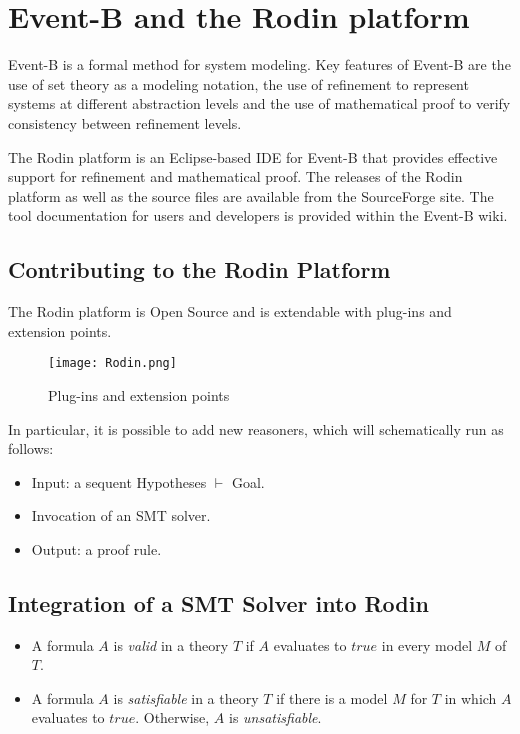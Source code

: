 \section{Event-B and the Rodin platform}
Event-B is a formal method for system modeling. Key features of Event-B are the use of set theory as a modeling notation, the use of refinement to represent systems at different abstraction levels and the use of mathematical proof to verify consistency between refinement levels.

The Rodin platform is an Eclipse\cite{ECLIPSE}-based IDE for Event-B that provides effective support for refinement and mathematical proof. The releases\cite{RODIN} of the Rodin platform as well as the source files\cite{SOURCES} are available from the SourceForge site. The tool documentation for users and developers is provided within the Event-B wiki\cite{WIKI}.

\subsection{Contributing to the Rodin Platform}
The Rodin platform is Open Source and is extendable with plug-ins and extension points.

\begin{figure}
\centering
\texttt{[image: Rodin.png]}
\caption{Plug-ins and extension points} 
\label{Fig:Rodin Platform}
\end{figure}

In particular, it is possible to add new reasoners, which will schematically run as follows:
\begin{itemize}
\item Input: a sequent Hypotheses $\vdash$ Goal.
\item Invocation of an SMT solver.
\item Output: a proof rule.
\end{itemize}

\subsection{Integration of a SMT Solver into Rodin}
\begin{itemize}
\item A formula $A$ is \textit{valid} in a theory $T$ if $A$ evaluates to $true$ in every model $M$ of $T$.
\item A formula $A$ is \textit{satisfiable} in a theory $T$ if there is a model $M$ for $T$ in which $A$ evaluates to $true$. Otherwise, $A$ is \textit{unsatisfiable}.
\end{itemize}

